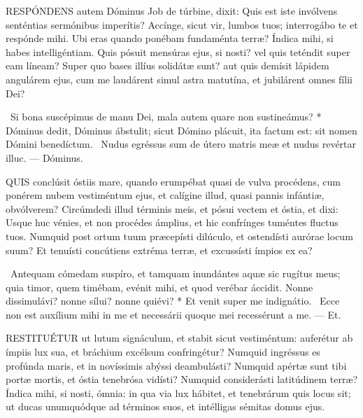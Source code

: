 


\lettrine[lines=2]{R}{ESPÓNDENS} autem Dóminus Job de túrbine, dixit: Quis est iste invólvens senténtias sermónibus imperítis? Accínge, sicut vir, lumbos tuos; interrogábo te et respónde mihi. Ubi eras quando ponébam fundaménta terræ? Índica mihi, si habes intelligéntiam. Quis pósuit mensúras ejus, si nosti? vel quis teténdit super eam líneam? Super quo bases illíus solidátæ sunt? aut quis demísit lápidem angulárem ejus, cum me laudárent simul astra matutína, et jubilárent omnes fílii Dei?

\R\ Si bona suscépimus de manu Dei, mala autem quare non sustineámus? * Dóminus dedit, Dóminus ábstulit; sicut Dómino plácuit, ita factum est: sit nomen Dómini benedíctum. \V\ Nudus egréssus sum de útero matris meæ et nudus revértar illuc. — Dóminus.


\lettrine[lines=2]{Q}{UIS} conclúsit óstiis mare, quando erumpébat quasi de vulva procédens, cum ponérem nubem vestiméntum ejus, et calígine illud, quasi pannis infántiæ, obvólverem? Circúmdedi illud términis meis, et pósui vectem et óstia, et dixi: Usque huc vénies, et non procédes ámplius, et hic confrínges tuméntes fluctus tuos. Numquid post ortum tuum præcepísti dilúculo, et ostendísti aurórae locum suum? Et tenuísti concútiens extréma terræ, et excussísti ímpios ex ea?

\R\ Antequam cómedam suspíro, et tamquam inundántes aquæ sic rugítus meus; quia timor, quem timébam, evénit mihi, et quod verébar áccidit. Nonne dissimulávi? nonne sílui? nonne quiévi? * Et venit super me indignátio. \V\ Ecce non est auxílium mihi in me et necessárii quoque mei recessérunt a me. — Et.



\lettrine[lines=2]{R}{ESTITUÉTUR} ut lutum signáculum, et stabit sicut vestiméntum: auferétur ab ímpiis lux sua, et bráchium excélsum confringétur? Numquid ingréssus es profúnda maris, et in novíssimis abýssi deambulásti? Numquid apértæ sunt tibi portæ mortis, et óstia tenebrósa vidísti? Numquid considerásti latitúdinem terræ? Índica mihi, si nosti, ómnia: in qua via lux hábitet, et tenebrárum quis locus sit; ut ducas unumquódque ad términos suos, et intélligas sémitas domus ejus.

